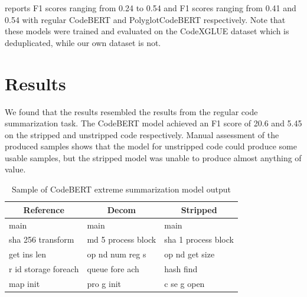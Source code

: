 \citeauthor{PolyglotCodeBERT} reports F1 scores ranging from 0.24 to 0.54 and F1 scores ranging from 0.41 and 0.54 with regular CodeBERT and PolyglotCodeBERT respectively. Note that these models were trained and evaluated on the CodeXGLUE \cite{CodeXGlue} dataset which is deduplicated, while our own dataset is not. %

\section{Results}
We found that the results resembled the results from the regular code summarization task. The CodeBERT model achieved an F1 score of 20.6 and 5.45 on the stripped and unstripped code respectively. Manual assessment of the produced samples shows that the model for unstripped code could produce some usable samples, but the stripped model was unable to produce almost anything of value.

\begin{table}[h]
\begin{tabular}{l|ll}
\multicolumn{1}{c|}{Reference} & \multicolumn{1}{c}{Decom} & \multicolumn{1}{c}{Stripped} \\ \hline
main                           & main                      & main                         \\
sha 256 transform              & md 5  process  block      & sha 1  process  block        \\
get ins len                    & op nd  num  reg s         & op nd  get  size             \\
r id storage foreach           & queue  fore ach           & hash  find                   \\
map init                       & pro g  init               & c se g  open                
\end{tabular}
\caption{Sample of CodeBERT extreme summarization model output}
\end{table}



